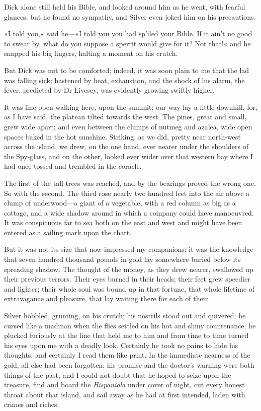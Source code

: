 Dick alone still held his Bible, and looked around him as he went, with fearful glances; but he found no sympathy, and Silver even joked him on his precautions.

»I told you,« said he—»I told you you had sp'iled your Bible. If it ain't no good to swear by, what do you suppose a sperrit would give for it? Not that!« and he snapped his big fingers, halting a moment on his crutch.

But Dick was not to be comforted; indeed, it was soon plain to me that the lad was falling sick; hastened by heat, exhaustion, and the shock of his alarm, the fever, predicted by Dr Livesey, was evidently growing swiftly higher.

It was fine open walking here, upon the summit; our way lay a little downhill, for, as I have said, the plateau tilted towards the west. The pines, great and small, grew wide apart; and even between the clumps of nutmeg and azalea, wide open spaces baked in the hot sunshine. Striking, as we did, pretty near north-west across the island, we drew, on the one hand, ever nearer under the shoulders of the Spy-glass, and on the other, looked ever wider over that western bay where I had once tossed and trembled in the coracle.

The first of the tall trees was reached, and by the bearings proved the wrong one. So with the second. The third rose nearly two hundred feet into the air above a clump of underwood—a giant of a vegetable, with a red column as big as a cottage, and a wide shadow around in which a company could have manoeuvred. It was conspicuous far to sea both on the east and west and might have been entered as a sailing mark upon the chart.

But it was not its size that now impressed my companions; it was the knowledge that seven hundred thousand pounds in gold lay somewhere buried below its spreading shadow. The thought of the money, as they drew nearer, swallowed up their previous terrors. Their eyes burned in their heads; their feet grew speedier and lighter; their whole soul was bound up in that fortune, that whole lifetime of extravagance and pleasure, that lay waiting there for each of them.

Silver hobbled, grunting, on his crutch; his nostrils stood out and quivered; he cursed like a madman when the flies settled on his hot and shiny countenance; he plucked furiously at the line that held me to him and from time to time turned his eyes upon me with a deadly look. Certainly he took no pains to hide his thoughts, and certainly I read them like print. In the immediate nearness of the gold, all else had been forgotten: his promise and the doctor's warning were both things of the past, and I could not doubt that he hoped to seize upon the treasure, find and board the \textit{Hispaniola} under cover of night, cut every honest throat about that island, and sail away as he had at first intended, laden with crimes and riches.

